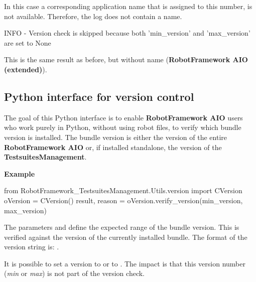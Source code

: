 In this case a corresponding application name that is assigned to this number, is not available. Therefore, the log does not contain
a name.


\begin{robotlog}
INFO - Version check is skipped because both 'min_version' and 'max_version' are set to None
\end{robotlog}

This is the same result as before, but without name (\textbf{RobotFramework AIO (extended)}).





\newpage

\subsection{Python interface for version control}

The goal of this Python interface is to enable \textbf{RobotFramework AIO} users who work purely in Python, without using robot files,
to verify which bundle version is installed. The bundle version is either the version of the entire \textbf{RobotFramework AIO}
or, if installed standalone, the version of the \textbf{TestsuitesManagement}.

\vspace{2ex}

\textbf{Example}

\begin{pythoncode}
from RobotFramework_TestsuitesManagement.Utils.version import CVersion
oVersion = CVersion()
result, reason = oVersion.verify_version(min_version, max_version)
\end{pythoncode}

The parameters  and   define the expected range of the bundle version. This is verified
against the version of the currently installed bundle. The format of the version string is: .

It is possible to set a version to  or to \pcode{\"\"}. The impact is that this version number (\textit{min}
or \textit{max}) is not part of the version check.

